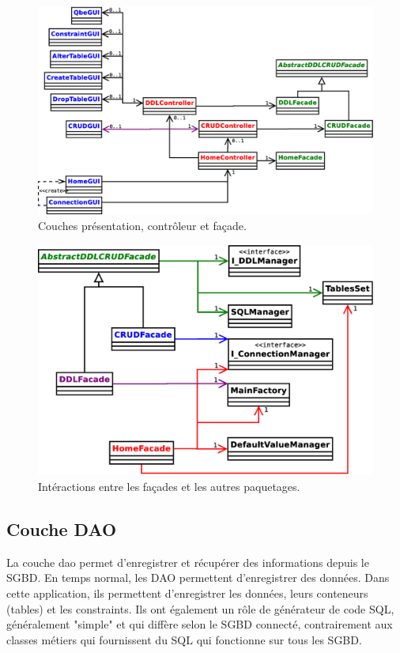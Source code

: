 \begin{figure}[!h]
\centering
\includegraphics[width=14cm]{images/facades_crud_ddl.eps}
\caption{Couches présentation, contrôleur et façade.}
\label{trois_premières_couches}
\end{figure}

\begin{figure}[!h]
\centering
\includegraphics[width=14cm]{images/facades_managers.eps}
\caption{Intéractions entre les façades et les autres paquetages.}
\label{facades_et_managers}
\end{figure}

\subsection{Couche DAO}
La couche \gls{dao} permet d'enregistrer et récupérer des informations depuis le SGBD.
En temps normal, les DAO permettent d'enregistrer des données.
Dans cette application, ils permettent d'enregistrer les données, leurs conteneurs (tables) et les \glspl{constraint}.
Ils ont également un rôle de générateur de code SQL, généralement "simple" et qui diffère selon le SGBD connecté, contrairement aux classes métiers qui fournissent du SQL qui fonctionne sur tous les SGBD.

